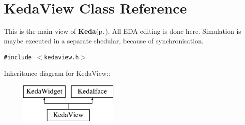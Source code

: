 \section{Keda\-View Class Reference}
\label{classKedaView}
This is the main view of {\bf Keda}{\rm (p.\,\pageref{classKeda})}. All EDA editing is done here. Simulation is maybe executed in a separate shedular, because of synchronisation.  


{\tt \#include $<$kedaview.h$>$}

Inheritance diagram for Keda\-View::\begin{figure}[H]
\begin{center}
\leavevmode
\includegraphics[height=2cm]{classKedaView}
\end{center}
\end{figure}

